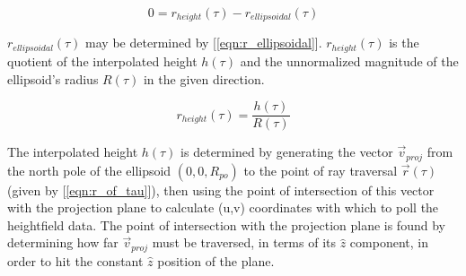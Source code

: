 \documentclass[a4paper,10pt]{article}
\begin{document}
\begin{equation}\label{eqn:intersection}
0 = r_{height}(\tau) - r_{ellipsoidal}(\tau) 
\end{equation}

$r_{ellipsoidal}(\tau)$ may be determined by [\ref{eqn:r_ellipsoidal}].
$r_{height}(\tau)$ is the quotient of the interpolated height $h(\tau)$ and the unnormalized magnitude of the ellipsoid's radius $R(\tau)$ in the given direction.

\begin{equation}\label{eqn:r_height}
 r_{height}(\tau) = \frac{h(\tau)}{R(\tau)}
\end{equation}

The interpolated height $h(\tau)$ is determined by generating the vector $\vec{v}_{proj}$ from the north pole of the ellipsoid $(0, 0, R_{po})$
to the point of ray traversal $\vec{r}(\tau)$ (given by [\ref{eqn:r_of_tau}]),
then using the point of intersection of this vector with the projection plane to calculate (u,v) coordinates with which to poll the heightfield data.
The point of intersection with the projection plane is found by determining how far $\vec{v}_{proj}$ must be traversed, in terms of its $\hat{z}$ component,
in order to hit the constant $\hat{z}$ position of the plane.
\end{document}
